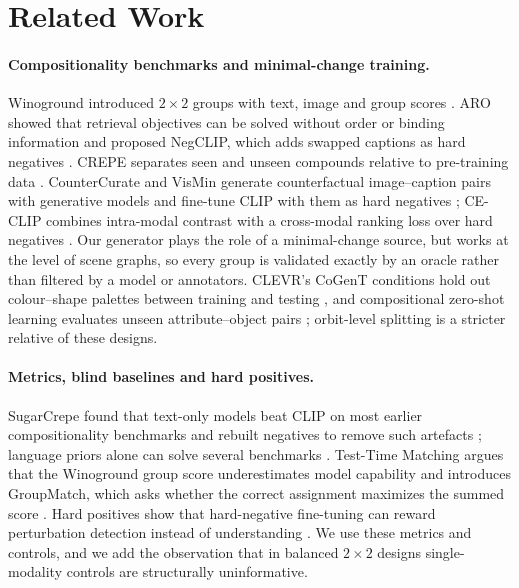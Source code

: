 \section{Related Work}
\label{sec:related}

\paragraph{Compositionality benchmarks and minimal-change training.}
Winoground introduced $2{\times}2$ groups with text, image and group scores
\citep{thrush2022winoground}. ARO showed that retrieval objectives can be solved without order or
binding information and proposed NegCLIP, which adds swapped captions as hard negatives
\citep{yuksekgonul2023bow}. CREPE separates seen and unseen compounds relative to pre-training data
\citep{ma2023crepe}. CounterCurate and VisMin generate counterfactual image--caption pairs with
generative models and fine-tune CLIP with them as hard negatives \citep{zhang2024countercurate,
awal2024vismin}; CE-CLIP combines intra-modal contrast with a cross-modal ranking loss over hard
negatives \citep{zhang2024contrasting}. Our generator plays the role of a minimal-change source,
but works at the level of scene graphs, so every group is validated exactly by an oracle rather than
filtered by a model or annotators. CLEVR's CoGenT conditions hold out colour--shape palettes
between training and testing \citep{johnson2017clevr}, and compositional zero-shot learning
evaluates unseen attribute--object pairs \citep{nayak2023csp}; orbit-level splitting is a stricter
relative of these designs.

\paragraph{Metrics, blind baselines and hard positives.}
SugarCrepe found that text-only models beat CLIP on most earlier compositionality benchmarks and
rebuilt negatives to remove such artefacts \citep{hsieh2023sugarcrepe}; language priors alone can
solve several benchmarks \citep{lin2024languagepriors}. Test-Time Matching argues that the
Winoground group score underestimates model capability and introduces GroupMatch, which asks whether
the correct assignment maximizes the summed score \citep{zhu2025ttm}. Hard positives show that
hard-negative fine-tuning can reward perturbation detection instead of understanding
\citep{kamath2024hardpositive}. We use these metrics and controls, and we add the observation that
in balanced $2{\times}2$ designs single-modality controls are structurally uninformative.

